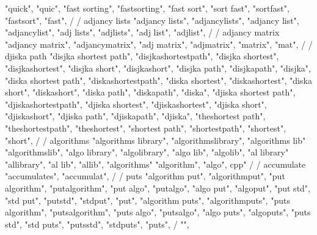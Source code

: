 {{{{{{{{{{{{{        "quick",  
        "quic",  
        "fast sorting",  
        "fastsorting",  
        "fast sort",  
        "sort fast",  
        "sortfast",  
        "fastsort",  
        "fast",  
        /
        / adjancy lists
        "adjancy lists",  
        "adjancylists",  
        "adjancy list",  
        "adjancylist",  
        "adj lists",  
        "adjlists",  
        "adj list",  
        "adjlist",  
        /
        / adjancy matrix 
        "adjancy matrix",  
        "adjancymatrix",  
        "adj matrix",  
        "adjmatrix",  
        "matrix",  
        "mat",  
        /
        / djiska path 
        "disjka shortest path",  
        "disjkashortestpath",  
        "disjka shortest",  
        "disjkashortest",  
        "disjka short",  
        "disjkashort",  
        "disjka path",  
        "disjkapath",  
        "disjka",  
        "diska shortest path",  
        "diskashortestpath",  
        "diska shortest",  
        "diskashortest",  
        "diska short",  
        "diskashort",  
        "diska path",  
        "diskapath",  
        "diska",  
        "djiska shortest path",  
        "djiskashortestpath",  
        "djiska shortest",  
        "djiskashortest",  
        "djiska short",  
        "djiskashort",  
        "djiska path",  
        "djiskapath",  
        "djiska",  
        "theshortest path",  
        "theshortestpath",  
        "theshortest",  
        "shortest path",  
        "shortestpath",  
        "shortest",  
        "short",  
        /
        / algorithms 
        "algorithms library",
        "algorithmslibrary", 
        "algorithms lib"
        "algorithmslib",
        "algo library", 
        "algolibrary",
        "algo lib", 
        "algolib",
        "al library"
        "allibrary",
        "al lib",
        "allib",
        "algorithms"
        "algorithm",
        "algo", cpp"
        /
        / accumulate
        "accumulates",  
        "accumulat",  
        /
        / puts 
        "algorithm put",  
        "algorithmput",  
        "put algorithm",  
        "putalgorithm",  
        "put algo",  
        "putalgo",  
        "algo put",  
        "algoput",  
        "put std",  
        "std put",  
        "putstd",  
        "stdput",  
        "put",  
        "algorithm puts",  
        "algorithmputs",  
        "puts algorithm",  
        "putsalgorithm",  
        "puts algo",  
        "putsalgo",  
        "algo puts",  
        "algoputs",  
        "puts std",  
        "std puts",  
        "putsstd",  
        "stdputs",  
        "puts",  
        / {"", 
}}}}}}}}}}}}}}
